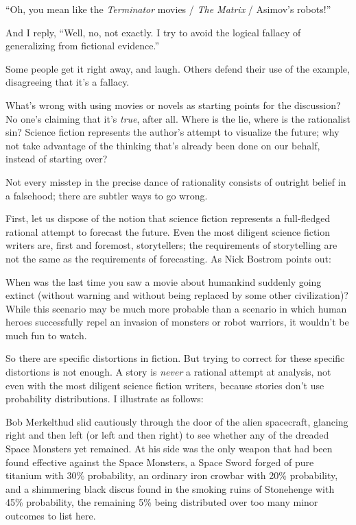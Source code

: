 {
 ``Oh, you mean like the \textit{Terminator}
movies / \textit{The Matrix} / Asimov's
robots!''}

{
 And I reply, ``Well, no, not exactly. I try to
avoid the logical fallacy of generalizing from fictional
evidence.''}

{
 Some people get it right away, and laugh. Others defend their use
of the example, disagreeing that it's a fallacy.}

{
 What's wrong with using movies or novels as
starting points for the discussion? No one's claiming
that it's \textit{true}, after all. Where is the lie,
where is the rationalist sin? Science fiction represents the
author's attempt to visualize the future; why not take
advantage of the thinking that's already been done on
our behalf, instead of starting over?}

{
 Not every misstep in the precise dance of rationality consists of
outright belief in a falsehood; there are subtler ways to go wrong.}

{
 First, let us dispose of the notion that science fiction
represents a full-fledged rational attempt to forecast the future. Even
the most diligent science fiction writers are, first and foremost,
storytellers; the requirements of storytelling are not the same as the
requirements of forecasting. As Nick Bostrom points
out:}

{
 When was the last time you saw a movie about humankind suddenly
going extinct (without warning and without being replaced by some other
civilization)? While this scenario may be much more probable than a
scenario in which human heroes successfully repel an invasion of
monsters or robot warriors, it wouldn't be much fun to
watch.}

{
 So there are specific distortions in fiction. But trying to
correct for these specific distortions is not enough. A story is
\textit{never} a rational attempt at analysis, not even with the most
diligent science fiction writers, because stories don't
use probability distributions. I illustrate as follows:}

{
 Bob Merkelthud slid cautiously through the door of the alien
spacecraft, glancing right and then left (or left and then right) to
see whether any of the dreaded Space Monsters yet remained. At his side
was the only weapon that had been found effective against the Space
Monsters, a Space Sword forged of pure titanium with 30\% probability,
an ordinary iron crowbar with 20\% probability, and a shimmering black
discus found in the smoking ruins of Stonehenge with 45\% probability,
the remaining 5\% being distributed over too many minor outcomes to
list here.}

